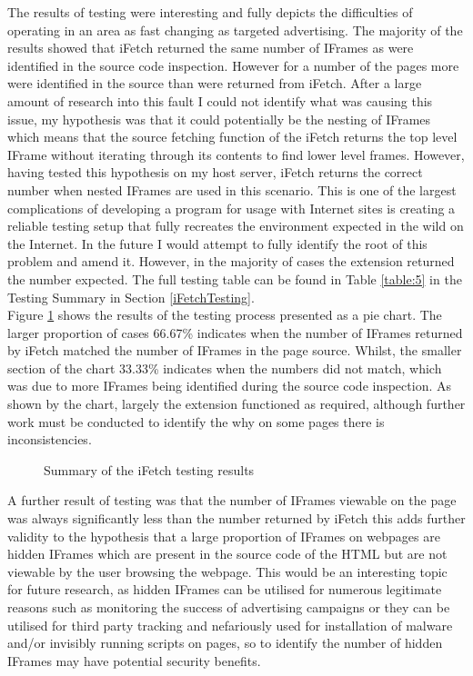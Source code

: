 \documentclass[12pt]{article}
\begin{document}
The results of testing were interesting and fully depicts the difficulties of operating in an area as fast changing as targeted advertising. The majority of the results showed that iFetch returned the same number of IFrames as were identified in the source code inspection. However for a number of the pages more were identified in the source than were returned from iFetch. After a large amount of research into this fault I could not identify what was causing this issue, my hypothesis was that it could potentially be the nesting of IFrames which means that the source fetching function of the iFetch returns the top level IFrame without iterating through its contents to find lower level frames. However, having tested this hypothesis on my host server, iFetch returns the correct number when nested IFrames are used in this scenario. This is one of the largest complications of developing a program for usage with Internet sites is creating a reliable testing setup that fully recreates the environment expected in the wild on the Internet. In the future I would attempt to fully identify the root of this problem and amend it. However, in the majority of cases the extension returned the number expected. The full testing table can be found in Table \ref{table:5} in the Testing Summary in Section \ref{iFetchTesting}. \\

Figure \ref{fig:ifPie} shows the results of the testing process presented as a pie chart. The larger proportion of cases 66.67\% indicates when the number of IFrames returned by iFetch matched the number of IFrames in the page source. Whilst, the smaller section of the chart 33.33\% indicates when the numbers did not match, which was due to more IFrames being identified during the source code inspection. As shown by the chart, largely the extension functioned as required, although further work must be conducted to identify the why on some pages there is inconsistencies.  

\begin{figure} [H]
    \centering
        \caption{Summary of the iFetch testing results}
        \label{fig:ifPie}
\end{figure}

A further result of testing was that the number of IFrames viewable on the page was always significantly less than the number returned by iFetch this adds further validity to the hypothesis that a large proportion of IFrames on webpages are hidden IFrames which are present in the source code of the HTML but are not viewable by the user browsing the webpage. This would be an interesting topic for future research, as hidden IFrames can be utilised for numerous legitimate reasons such as monitoring the success of advertising campaigns or they can be utilised for third party tracking and nefariously used for installation of malware and/or invisibly running scripts on pages, so to identify the number of hidden IFrames may have potential security benefits. 
\end{document}
